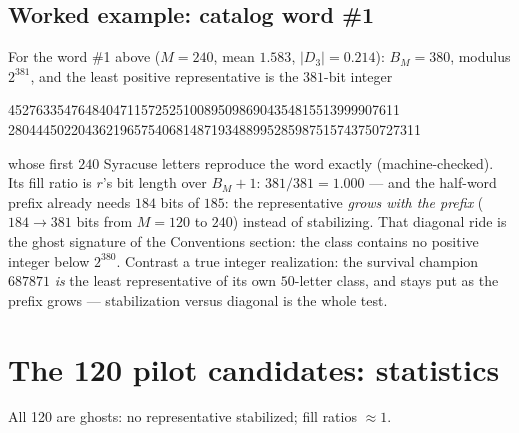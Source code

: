 \documentclass[10pt]{article}
\begin{document}
\subsection*{Worked example: catalog word \#1}
For the word \#1 above ($M=240$, mean $1.583$, $|D_3|=0.214$):
$B_M=380$, modulus $2^{381}$, and the least positive representative is
the $381$-bit integer
\begin{center}\ttfamily\small
45276335476484047115725251008950986904354815513999907611\\
28044450220436219657540681487193488995285987515743750727311
\end{center}
whose first $240$ Syracuse letters reproduce the word exactly
(machine-checked). Its fill ratio is $r$'s bit length over $B_M+1$:
$381/381=1.000$ --- and the half-word prefix already needs $184$ bits of
$185$: the representative \emph{grows with the prefix} ($184\to381$
bits from $M=120$ to $240$) instead of stabilizing. That diagonal ride
is the ghost signature of the Conventions section: the class contains
no positive integer below $2^{380}$. Contrast a true integer
realization: the survival champion $687871$ \emph{is} the least
representative of its own $50$-letter class, and stays put as the
prefix grows --- stabilization versus diagonal is the whole test.

\section{The 120 pilot candidates: statistics}
All 120 are ghosts: no representative stabilized; fill ratios
$\approx 1$.\medskip
\end{document}
